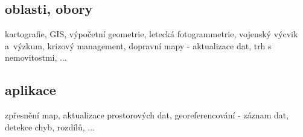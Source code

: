 \subsection{oblasti, obory}
\label{obory}
kartografie, GIS, výpočetní geometrie, letecká fotogrammetrie, vojenský výcvik 
a~výzkum, krizový management, dopravní mapy - aktualizace dat, trh s nemovitostmi, ...

\subsection{aplikace}
\label{aplikace}
zpřesnění map, aktualizace prostorových dat, georeferencování - záznam dat, detekce 
chyb, rozdílů, ...

